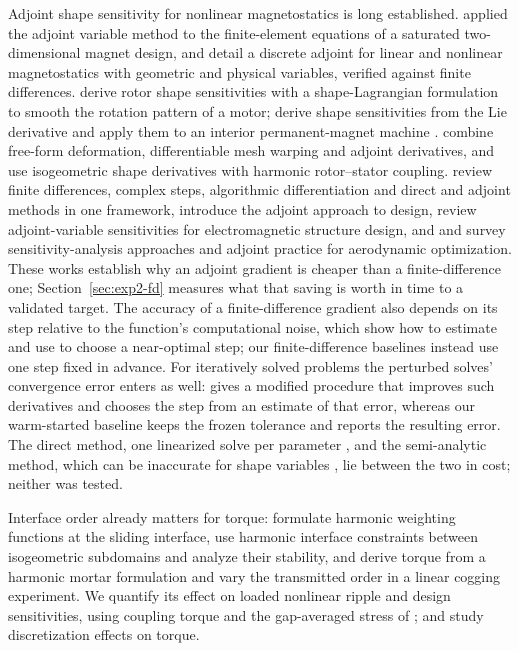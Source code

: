 \documentclass{anvil-paper}
\begin{document}
Adjoint shape sensitivity for nonlinear magnetostatics is long
established. \citet{park1992design} applied the adjoint variable method to
the finite-element equations of a saturated two-dimensional magnet design,
and \citet{elbechari2022adjoint} detail a discrete adjoint for linear and
nonlinear magnetostatics with geometric and physical variables, verified
against finite differences.
\citet{gangl2015shape} derive rotor shape sensitivities with a
shape-Lagrangian formulation to smooth the rotation pattern of a motor;
\citet{kuci2017design} derive shape sensitivities from the Lie derivative
and apply them to an interior permanent-magnet machine
\citep{kuci2016shape}. \citet{scotzniovsky2025} combine free-form
deformation, differentiable mesh warping and adjoint derivatives, and
\citet{merkel2021shape} use isogeometric shape derivatives with harmonic
rotor--stator coupling. \citet{martins2013review} review finite
differences, complex steps, algorithmic differentiation and direct and
adjoint methods in one framework, \citet{giles2000introduction} introduce
the adjoint approach to design, \citet{nikolova2004adjoint} review
adjoint-variable sensitivities for electromagnetic structure design, and
\citet{peter2010numerical} and \citet{kenway2019effective} survey
sensitivity-analysis approaches and adjoint practice for aerodynamic
optimization. These works establish why an adjoint gradient is cheaper than
a finite-difference one; Section~\ref{sec:exp2-fd} measures what that
saving is worth in time to a validated target. The accuracy of a
finite-difference gradient also depends on its step relative to the
function's computational noise, which \citet{more2011estimating} show how
to estimate and \citet{more2012estimating} use to choose a near-optimal
step; our finite-difference baselines instead use one step fixed in advance.
For iteratively solved problems the perturbed solves' convergence error
enters as well: \citet{haftka1985sensitivity} gives a modified procedure
that improves such derivatives and \citet{eyi2011finite} chooses the step
from an estimate of that error, whereas our warm-started baseline keeps the
frozen tolerance and reports the resulting error. The direct method, one
linearized solve per parameter \citep{adelman1986sensitivity}, and the
semi-analytic method, which can be inaccurate for shape variables
\citep{barthelemy1990accuracy}, lie between the two in cost; neither was
tested.

Interface order already matters for torque:
\citet{degersem2004harmonic} formulate harmonic weighting functions at the
sliding interface, \citet{bontinck2018isogeometric} use harmonic interface
constraints between isogeometric subdomains and analyze their stability,
and \citet{egger2022torque} derive torque from a harmonic mortar
formulation and vary the transmitted order in a linear cogging
experiment. We quantify its effect on loaded nonlinear ripple and design sensitivities,
using coupling torque and the gap-averaged stress of \citet{arkkio1987};
\citet{howe1992cogging} and \citet{arkkio2012proper} study discretization
effects on torque.
\end{document}
